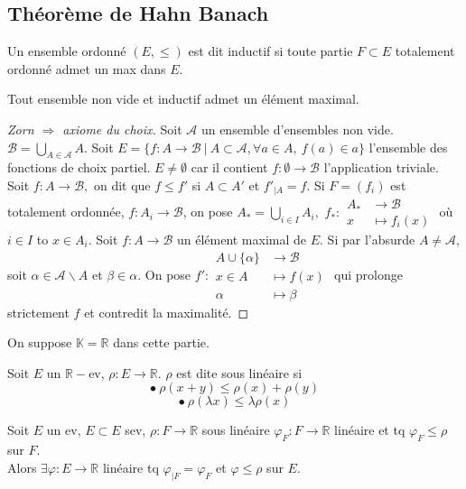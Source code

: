 \subsection{Théorème de Hahn Banach}
\begin{definition}
    Un ensemble ordonné $(E,\le )$ est dit inductif si toute partie $F\subset E$ totalement ordonné admet un max dans $E.$
\end{definition}
\begin{lemme}[Zorn]
    Tout ensemble non vide et inductif admet un élément maximal.
\end{lemme}
\begin{proof}[Zorn $\Rightarrow$ axiome du choix]
    Soit $\mathcal{A}$ un ensemble d'ensembles non vide. $\mathcal{B}=\bigcup\limits_{A\in \mathcal{A}} A$. Soit $E=\{f:A\to \mathcal{B}\ |\ A\subset \mathcal{A},\forall a\in A,\ f(a)\in a \} $ l'ensemble des fonctions de choix partiel. $E\neq \emptyset $ car il contient $f:\emptyset \to \mathcal{B}$ l'application triviale.\\
    Soit $f:A\to \mathcal{B},$ on dit que $f\le f'$ si $A\subset A'$ et $f'_{|A}=f.$ Si $F=\left( f_i \right) $ est totalement ordonnée, $f:A_i\to \mathcal{B}$, on pose $A_*=\bigcup\limits_{i\in I} A_i,$ $f_* :\begin{aligned}
        A_* &\longrightarrow \mathcal{B} \\
        x &\longmapsto f_i(x)
    \end{aligned}$ où $i\in I$ to $x\in A_i.$ Soit $f:A\to \mathcal{B}$ un élément maximal de $E.$ Si par l'absurde $A\neq \mathcal{A}$, soit $\alpha\in \mathcal{A}\backslash A$ et $\beta\in \alpha .$ On pose $f' :\begin{aligned}
        A\cup \{\alpha\}  &\longrightarrow \mathcal{B} \\
        x\in A &\longmapsto f(x)\\
        \alpha &\longmapsto \beta
    \end{aligned}$ qui prolonge strictement $f$ et contredit la maximalité.
\end{proof}
On suppose $\mathbb{K}=\mathbb{R} $ dans cette partie.
\begin{definition}
    Soit $E$ un $\mathbb{R} -$ev, $\rho:E\to \mathbb{R} $. $\rho$ est dite sous linéaire si
    $$\bullet\ \rho(x+y)\le \rho(x)+\rho(y)$$
    $$\bullet\ \rho(\lambda x)\le \lambda\rho(x)$$

\end{definition}
\begin{ex}
    Soit $E$ un ev, $E\subset E$ sev, $\rho:F\to \mathbb{R} $ sous linéaire $\varphi _F:F\to \mathbb{R} $ linéaire et tq $\varphi _F\le \rho$ sur $F.$\\
    Alors $\exists \varphi :E\to \mathbb{R}$ linéaire tq $\varphi _{|F}=\varphi _F$ et $\varphi \le \rho$ sur $E.$
\end{ex}

